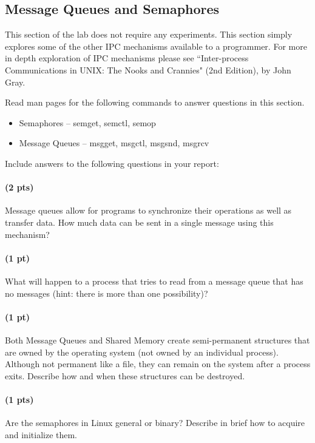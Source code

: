 \documentclass[letterpaper,10pt]{article}
\begin{document}
\subsection{Message Queues and Semaphores}

This section of the lab does not require any experiments. This section simply explores some of
the other IPC mechanisms available to a programmer. For more in depth exploration of IPC
mechanisms please see ``Inter-process Communications in UNIX: The Nooks and Crannies" (2nd
Edition), by John Gray.

Read man pages for the following commands to answer questions in this section.

\begin{itemize}
 \item Semaphores – semget, semctl, semop
 \item Message Queues – msgget, msgctl, msgsnd, msgrcv
\end{itemize}

Include answers to the following questions in your report:
\paragraph{(2 pts)} Message queues allow for programs to synchronize their operations as well as
transfer data. How much data can be sent in a single message using this mechanism?
\paragraph{(1 pt)} What will happen to a process that tries to read from a message queue that has no
messages (hint: there is more than one possibility)?
\paragraph{(1 pt)} Both Message Queues and Shared Memory create semi-permanent structures that
are owned by the operating system (not owned by an individual process). Although not
permanent like a file, they can remain on the system after a process exits. Describe how
and when these structures can be destroyed.
\paragraph{(1 pts)} Are the semaphores in Linux general or binary? Describe in brief how to acquire and
         initialize them.
\end{document}
